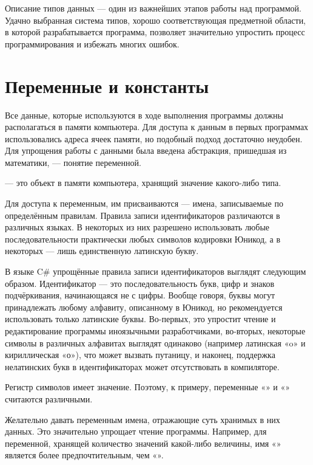 Описание типов данных — один из важнейших этапов работы над
программой.  Удачно выбранная система типов, хорошо соответствующая
предметной области, в которой разрабатывается программа, позволяет
значительно упростить процесс программирования и избежать многих
ошибок.

\section{Переменные и константы}


Все данные, которые используются в ходе выполнения программы должны
располагаться в памяти компьютера. Для доступа к данным в первых
программах использовались адреса ячеек памяти, но подобный подход
достаточно неудобен. Для упрощения работы с данными была введена
абстракция, пришедшая из математики, — понятие переменной.

\begin{defn}
   — это объект в памяти компьютера,
  хранящий значение какого-либо типа.
\end{defn}


Для доступа к переменным, им присваиваются
 — имена, записываемые по
определённым правилам. Правила записи идентификаторов различаются в
различных языках. В некоторых из них разрешено использовать любые
последовательности практически любых символов кодировки Юникод, а в
некоторых — лишь единственную латинскую букву.

В языке C\# упрощённые правила записи идентификаторов выглядят
следующим образом. Идентификатор — это последовательность букв, цифр и
знаков подчёркивания, начинающаяся не с цифры. Вообще говоря, буквы
могут принадлежать любому алфавиту, описанному в Юникод, но
рекомендуется использовать только латинские буквы. Во-первых, это
упростит чтение и редактирование программы иноязычными разработчиками,
во-вторых, некоторые символы в различных алфавитах выглядят одинаково
(например латинская «o» и кириллическая «о»), что может вызвать
путаницу, и наконец, поддержка нелатинских букв в идентификаторах
может отсутствовать в компиляторе.

Регистр символов имеет значение. Поэтому, к примеру, переменные
«» и «» считаются различными.

Желательно давать переменным имена, отражающие суть хранимых в них
данных. Это значительно упрощает чтение программы. Например, для
переменной, хранящей количество значений какой-либо величины, имя
«» является более предпочтительным, чем
«».

